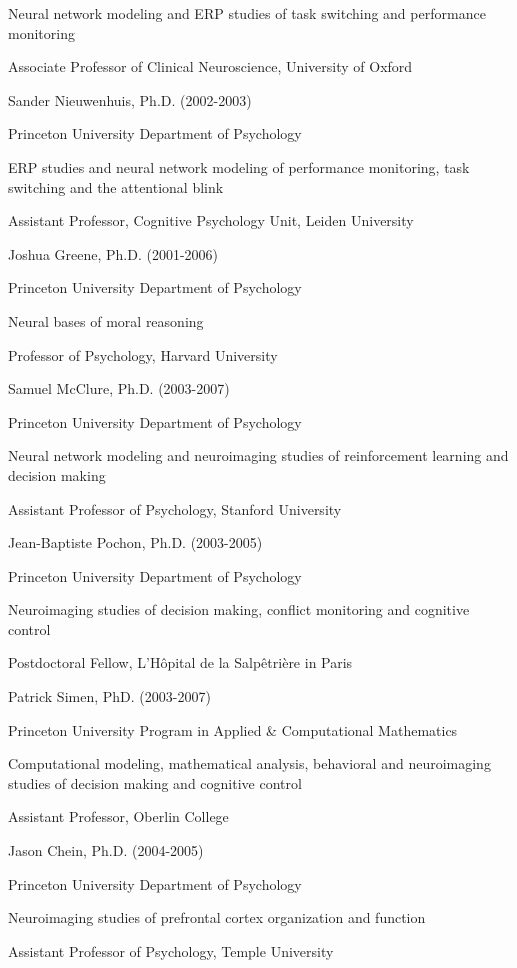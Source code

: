 \documentclass[10 pt]{article}
\begin{document}
Neural network modeling and ERP studies of task switching and performance monitoring

Associate Professor of Clinical Neuroscience, University of Oxford
    \medskip

Sander Nieuwenhuis, Ph.D. (2002-2003)

Princeton University Department of Psychology

ERP studies and neural network modeling of performance monitoring, task switching and the attentional blink

Assistant Professor, Cognitive Psychology Unit, Leiden University
    \medskip

Joshua Greene, Ph.D. (2001-2006)

Princeton University Department of Psychology

Neural bases of moral reasoning

Professor of Psychology, Harvard University
    \medskip

Samuel McClure, Ph.D. (2003-2007)

Princeton University Department of Psychology

Neural network modeling and neuroimaging studies of reinforcement learning and decision making

Assistant Professor of Psychology, Stanford University
    \medskip

Jean-Baptiste Pochon, Ph.D. (2003-2005)

Princeton University Department of Psychology

Neuroimaging studies of decision making, conflict monitoring and cognitive control

Postdoctoral Fellow, L'Hôpital de la Salpêtrière in Paris
    \medskip

Patrick Simen, PhD. (2003-2007)

Princeton University Program in Applied \& Computational Mathematics

Computational modeling, mathematical analysis, behavioral and neuroimaging studies of decision making and cognitive control

Assistant Professor, Oberlin College
    \medskip

Jason Chein, Ph.D. (2004-2005)

Princeton University Department of Psychology

Neuroimaging studies of prefrontal cortex organization and function

Assistant Professor of Psychology, Temple University
    \medskip
\end{document}
